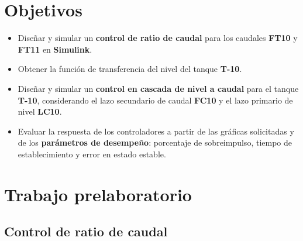 \section{Objetivos}

\begin{itemize}
    \item Diseñar y simular un \textbf{control de ratio de caudal} para los caudales \textbf{FT10} y \textbf{FT11} en \textbf{Simulink}.

    \item Obtener la función de transferencia del nivel del tanque \textbf{T-10}.

    \item Diseñar y simular un \textbf{control en cascada de nivel a caudal} para el tanque \textbf{T-10}, considerando el lazo secundario de caudal \textbf{FC10} y el lazo primario de nivel \textbf{LC10}.

    \item Evaluar la respuesta de los controladores a partir de las gráficas solicitadas y de los \textbf{parámetros de desempeño}: porcentaje de sobreimpulso, tiempo de establecimiento y error en estado estable.
\end{itemize}

\section{Trabajo prelaboratorio}

\subsection{Control de ratio de caudal}

